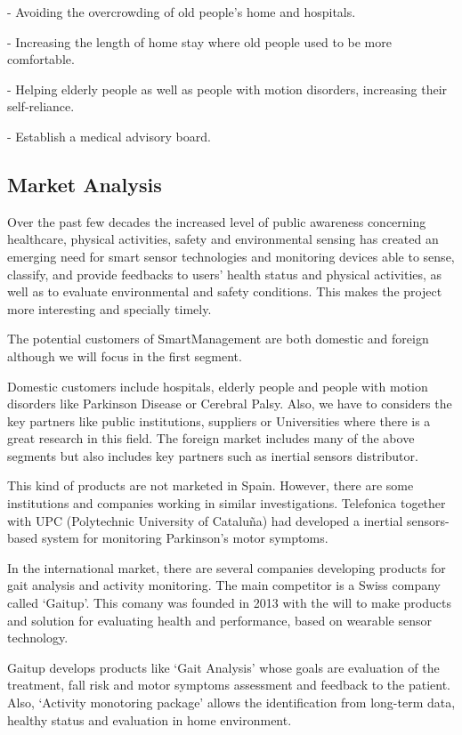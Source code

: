 -	Avoiding the overcrowding of old people's home and hospitals.

-	Increasing the length of home stay where old people used to be more comfortable.

-	Helping elderly people as well as people with motion disorders, increasing their self-reliance.

-	Establish a medical advisory board.

\vfill

\subsection{Market Analysis}
 Over the past few decades the increased level of public awareness concerning healthcare, physical activities, safety and environmental sensing has created an emerging need for smart sensor technologies and monitoring devices able to sense, classify, and provide feedbacks to users' health status and physical activities, as well as to evaluate environmental and safety conditions. This makes the project more interesting and specially timely.
 
 The potential customers of SmartManagement are both domestic and foreign although we will focus in the first segment.
 
 Domestic customers include hospitals, elderly people and people with motion disorders like Parkinson Disease or Cerebral Palsy. Also, we have to considers the key partners like public institutions, suppliers or Universities where there is a great research in this field.
  The foreign market includes many of the above segments but also includes key partners such as inertial sensors distributor.
 
 This kind of products are not marketed in Spain. However, there are some institutions and companies working in similar investigations. Telefonica  together with UPC (Polytechnic University of Cataluña) had developed a inertial sensors-based system for monitoring Parkinson's motor symptoms\cite{rempark}.
 
 In the international market, there are several companies developing products for gait analysis and activity monitoring. The main competitor is a Swiss company called ‘Gaitup’\cite{gaitup}. This comany was founded in 2013 with the will to make products and solution for evaluating health and performance, based on wearable sensor technology.
 
 Gaitup develops products like ‘Gait Analysis’ whose goals are evaluation of the treatment, fall risk and motor symptoms assessment and feedback to the patient. Also, ‘Activity monotoring package’ allows the identification from long-term data, healthy status and  evaluation in home environment.
 
